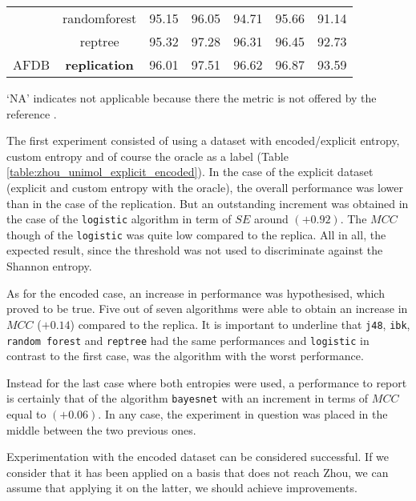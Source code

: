 \begin{table}[h]
\begin{center}
\begin{threeparttable}
\begin{tabular}{c c c c c c c}
  & randomforest & 95.15 & 96.05 & 94.71 & 95.66 & 91.14 \\
  & reptree & 95.32 & 97.28 & 96.31 & 96.45 & 92.73 \\
  \hline
  AFDB & \textbf{replication} & 96.01 & 97.51 & 96.62 & 96.87 & 93.59 \\
  \bottomrule
\end{tabular}
\begin{tablenotes}
 	\item ‘NA’ indicates not applicable because there the metric is not offered by the reference \cite{zhou2015}.
    \end{tablenotes}
\end{threeparttable}
\end{center}
\end{table}

The first experiment consisted of using a dataset with encoded/explicit entropy, custom entropy and of course the oracle as a label (Table \ref{table:zhou_unimol_explicit_encoded}). In the case of the explicit dataset (explicit and custom entropy with the oracle), the overall performance was lower than in the case of the replication. But an outstanding increment was obtained in the case of the \verb|logistic| algorithm in term of $SE$ around $(+0.92)$. The $MCC$ though of the \verb|logistic| was quite low compared to the replica. All in all, the expected result, since the threshold was not used to discriminate against the Shannon entropy. 

As for the encoded case, an increase in performance was hypothesised, which proved to be true. Five out of seven algorithms were able to obtain an increase in $MCC$ ($+0.14$) compared to the replica. It is important to underline that \verb|j48|, \verb|ibk|, \verb|random forest| and \verb|reptree| had the same performances and \verb|logistic| in contrast to the first case, was the algorithm with the worst performance.

Instead for the last case where both entropies were used, a performance to report is certainly that of the algorithm \verb|bayesnet| with an increment in terms of $MCC$ equal to $(+0.06)$. In any case, the experiment in question was placed in the middle between the two previous ones.

Experimentation with the encoded dataset can be considered successful. If we consider that it has been applied on a basis that does not reach Zhou, we can assume that applying it on the latter, we should achieve improvements.

